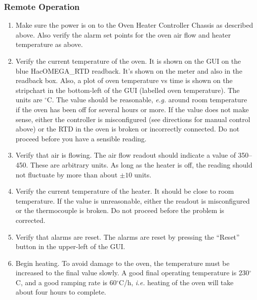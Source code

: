 {\subsubsection{Remote Operation}
\begin{enumerate}
\item Make sure the power is on to the Oven Heater Controller
Chassis as described above.  Also verify the alarm set points
for the oven air flow and heater temperature as above.  
\item Verify the current temperature of the oven.  It is shown
on the GUI on the blue HacOMEGA\_RTD readback.  It's shown on 
the meter and also in the readback box.  Also, a plot of oven temperature
vs time is shown on the stripchart in the bottom-left of the GUI 
(labelled oven temperature).  The units are $^\circ$C. 
The value should be reasonable,  {\it e.g.}\/ around room temperature 
if the oven has been off for several hours or more. If the value 
does not make sense, either the controller is misconfigured (see 
directions for manual control above) or the RTD in the oven is 
broken or incorrectly connected.  Do not proceed before you have 
a sensible reading.
\item Verify that air is flowing. The air flow readout should indicate
  a value of 350--450. These are arbitrary units. As long as the heater is
  off, the reading should not fluctuate by more than about $\pm 10$ units.
\item Verify the current temperature of the heater. It should be
  close to room temperature. If the value is unreasonable, either
  the readout is misconfigured or the thermocouple is broken.
  Do not proceed before the problem is corrected.
\item Verify that alarms are reset.  The alarms are reset by pressing
the ``Reset'' button in the upper-left of the GUI.  
\item Begin heating.  To avoid damage to the oven, the temperature 
must be increased to the final value slowly. A good final operating 
temperature is 230$^\circ$C, and a good ramping rate is 60$^\circ$C/h, 
{\it i.e.\/} heating of the oven will take about four hours to complete.


\end{enumerate}}
